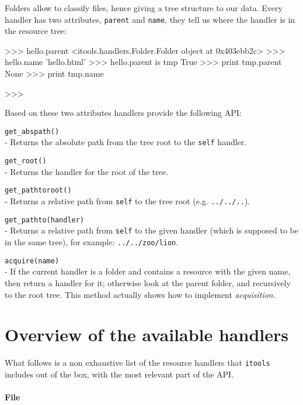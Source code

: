 Folders allow to classify files, hence giving a tree structure to our data.
Every handler has two attributes, {\tt parent} and {\tt name}, they tell us
where the handler is in the resource tree:

\begin{code}
    >>> hello.parent
    <itools.handlers.Folder.Folder object at 0x403ebb2c>
    >>> hello.name  
    'hello.html'
    >>> hello.parent is tmp
    True
    >>> print tmp.parent
    None
    >>> print tmp.name

    >>> 
\end{code}

Based on these two attributes handlers provide the following API:

\begin{api}
  {\tt get\_abspath()}\\
  - Returns the absolute path from the tree root to the {\tt self} handler.

  {\tt get\_root()}\\
  - Returns the handler for the root of the tree.

  {\tt get\_pathtoroot()}\\
  - Returns a relative path from {\tt self} to the tree root (e.g.
    {\tt ../../..}).

  {\tt get\_pathto(handler)}\\
  - Returns a relative path from {\tt self} to the given handler (which is
    supposed to be in the same tree), for example: {\tt ../../zoo/lion}.

  {\tt acquire(name)}\\
  - If the current handler is a folder and contains a resource with the given
    name, then return a handler for it; otherwise look at the parent folder,
    and recursively to the root tree. This method actually shows how to
    implement {\em acquisition}.
\end{api}



\section{Overview of the available handlers}

What follows is a non exhaustive list of the resource handlers that
{\tt itools} includes out of the box, with the most relevant part of the API.

\paragraph{File}

